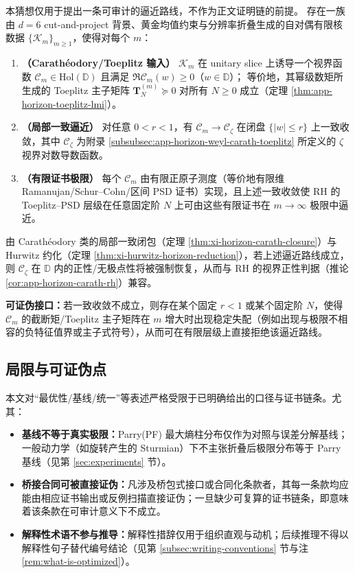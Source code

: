 \begin{conjecture}\label{conj:discussion-kernel-zeta-toeplitz-convergence}
本猜想仅用于提出一条可审计的逼近路线，不作为正文证明链的前提。
存在一族由 \(d=6\) cut-and-project 背景、黄金均值约束与分辨率折叠生成的自对偶有限核数据 \(\{\mathcal{K}_m\}_{m\ge 1}\)，使得对每个 \(m\)：
\begin{enumerate}
  \item \textbf{（Carath\'eodory/Toeplitz 输入）}
  \(\mathcal{K}_m\) 在 unitary slice 上诱导一个视界函数 \(\mathscr{C}_m\in\mathrm{Hol}(\mathbb{D})\) 且满足 \(\Re\mathscr{C}_m(w)\ge 0\)（\(w\in\mathbb{D}\)）；
  等价地，其幂级数矩所生成的 Toeplitz 主子矩阵 \(\mathbf{T}^{(m)}_N\succeq 0\) 对所有 \(N\ge 0\) 成立（定理 \ref{thm:app-horizon-toeplitz-lmi}）。
  \item \textbf{（局部一致逼近）}
  对任意 \(0<r<1\)，有 \(\mathscr{C}_m\to \mathscr{C}_\zeta\) 在闭盘 \(\{|w|\le r\}\) 上一致收敛，其中 \(\mathscr{C}_\zeta\) 为附录 \ref{subsubsec:app-horizon-weyl-carath-toeplitz} 所定义的 \(\zeta\) 视界对数导数函数。
  \item \textbf{（有限证书极限）}
  每个 \(\mathscr{C}_m\) 由有限正原子测度（等价地有限维 Ramanujan/Schur--Cohn/区间 PSD 证书）实现，且上述一致收敛使 RH 的 Toeplitz--PSD 层级在任意固定阶 \(N\) 上可由这些有限证书在 \(m\to\infty\) 极限中逼近。
\end{enumerate}
由 Carath\'eodory 类的局部一致闭包（定理 \ref{thm:xi-horizon-carath-closure}）与 Hurwitz 约化（定理 \ref{thm:xi-hurwitz-horizon-reduction}），若上述逼近路线成立，则 \(\mathscr{C}_\zeta\) 在 \(\mathbb{D}\) 内的正性/无极点性将被强制恢复，从而与 RH 的视界正性判据（推论 \ref{cor:app-horizon-carath-rh}）兼容。
\par
\textbf{可证伪接口：}若一致收敛不成立，则存在某个固定 \(r<1\) 或某个固定阶 \(N\)，使得 \(\mathscr{C}_m\) 的截断矩/Toeplitz 主子矩阵在 \(m\) 增大时出现稳定失配（例如出现与极限不相容的负特征值界或主子式符号），从而可在有限层级上直接拒绝该逼近路线。
\end{conjecture}

\subsection{局限与可证伪点}\label{subsec:limitations-falsifiable}
本文对“最优性/基线/统一”等表述严格受限于已明确给出的口径与证书链条。尤其：
\begin{itemize}
  \item \textbf{基线不等于真实极限：}Parry(PF) 最大熵柱分布仅作为对照与误差分解基线；一般动力学（如旋转产生的 Sturmian）下不主张折叠后极限分布等于 Parry 基线（见第 \ref{sec:experiments} 节）。
  \item \textbf{桥接合同可被直接证伪：}凡涉及桥包式接口或合同化条款者，其每一条款均应能由相应证书输出或反例扫描直接证伪；一旦缺少可复算的证书链条，即意味着该条款在可审计意义下不成立。
  \item \textbf{解释性术语不参与推导：}解释性措辞仅用于组织直观与动机；后续推理不得以解释性句子替代编号结论（见第 \ref{subsec:writing-conventions} 节与注 \ref{rem:what-is-optimized}）。
\end{itemize}

